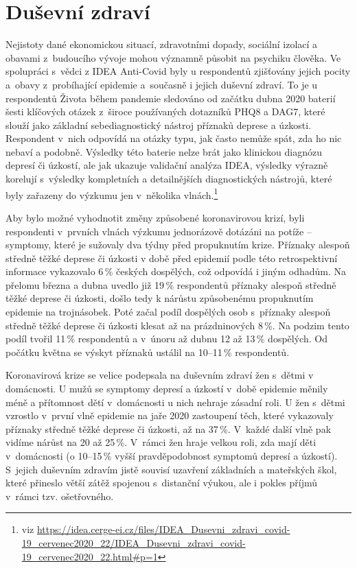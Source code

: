 \section*{Duševní zdraví}
\label{Dusevni_zdravi}

Nejistoty dané ekonomickou situací, zdravotními dopady, sociální izolací a obavami z budoucího vývoje mohou významně působit na psychiku člověka. Ve spolupráci s vědci z IDEA Anti-Covid byly u respondentů zjišťovány jejich pocity a obavy z probíhající epidemie a současně i jejich duševní zdraví. To je u respondentů Života během pandemie sledováno od začátku dubna 2020 baterií šesti klíčových otázek z široce používaných dotazníků PHQ8 a DAG7, které slouží jako základní sebediagnostický nástroj příznaků deprese a úzkosti. Respondent v nich odpovídá na otázky typu, jak často nemůže spát, zda ho nic nebaví a podobně. Výsledky této baterie nelze brát jako klinickou diagnózu depresí či úzkostí, ale jak ukazuje validační analýza IDEA, výsledky výrazně korelují s výsledky kompletních a detailnějších diagnostických nástrojů, které byly zařazeny do výzkumu jen v několika vlnách.\footnote{viz
\url{https://idea.cerge-ei.cz/files/IDEA\_Dusevni\_zdravi\_covid-19\_cervenec2020\_22/IDEA\_Dusevni\_zdravi\_covid-19\_cervenec2020\_22.html\#p=1}}

Aby bylo možné vyhodnotit změny způsobené koronavirovou krizí, byli respondenti v prvních vlnách výzkumu jednorázově dotázáni na potíže – symptomy, které je sužovaly dva týdny před propuknutím krize. Příznaky alespoň středně těžké deprese či úzkosti v době před epidemií podle této retrospektivní informace vykazovalo 6\,\% českých dospělých, což odpovídá i jiným odhadům. Na přelomu března a dubna uvedlo již 19\,\% respondentů příznaky alespoň středně těžké deprese či úzkosti, došlo tedy k nárůstu způsobenému propuknutím epidemie na trojnásobek. Poté začal podíl dospělých osob s příznaky alespoň středně těžké deprese či úzkosti klesat až na prázdninových 8\,\%. Na podzim tento podíl tvořil 11\,\% respondentů a v únoru až dubnu 12 až 13\,\% dospělých. Od počátku května se výskyt příznaků ustálil na 10–11\,\% respondentů.

Koronavirová krize se velice podepsala na duševním zdraví žen s dětmi v domácnosti. U mužů se symptomy depresí a úzkostí v době epidemie měnily méně a přítomnost dětí v domácnosti u nich nehraje zásadní roli. U žen s dětmi vzrostlo v první vlně epidemie na jaře 2020 zastoupení těch, které vykazovaly příznaky středně těžké deprese či úzkosti, až na 37\,\%. V každé další vlně pak vidíme nárůst na 20 až 25\,\%. V rámci žen hraje velkou roli, zda mají děti v domácnosti (o 10--15\,\% vyšší pravděpodobnost symptomů depresí a úzkostí). S jejich duševním zdravím jistě souvisí uzavření základních a mateřských škol, které přineslo větší zátěž spojenou s distanční výukou, ale i pokles příjmů v rámci tzv. ošetřovného.

